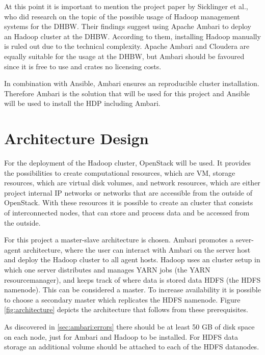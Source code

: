 At this point it is important to mention the project paper by Sicklinger et al., 
who did research on the topic of the possible usage of Hadoop management systems for the \ac{DHBW}.
Their findings suggest using Apache Ambari to deploy an Hadoop cluster at the \ac{DHBW}.
According to them, installing Hadoop manually is ruled out due to the technical complexity.
Apache Ambari and Cloudera are equally suitable for the usage at the \ac{DHBW}, 
but Ambari should be favoured since it is free to use and crates no licensing costs.
\autocite[][p. 53f]{wi2018managementsystems}

In combination with Ansible, Ambari ensures an reproducible cluster installation. 
Therefore Ambari is the solution that will be used for this project and Ansible will be used to install the \ac{HDP} including Ambari.

\section{Architecture Design}

For the deployment of the Hadoop cluster, OpenStack will be used.
It provides the possibilities to create computational resources, which are \acs{VM}, 
storage resources, which are virtual disk volumes, 
and network resources, which are either project internal \ac{IP} networks or networks that are accessible from the outside of OpenStack.
With these resources it is possible to create an cluster that consists of interconnected nodes, 
that can store and process data and be accessed from the outside.

For this project a master-slave architecture is chosen.
Ambari promotes a sever-agent architecture, 
where the user can interact with Ambari on the server host 
and deploy the Hadoop cluster to all agent hosts.
Hadoop uses an cluster setup in which one server distributes and manages \ac{YARN} jobs (the \ac{YARN} resourcemanager), 
and keeps track of where data is stored data \ac{HDFS} (the \ac{HDFS} namenode).
This can be considered a master.
To increase availability it is possible to choose a secondary master which replicates the \ac{HDFS} namenode.
Figure \vref{fig:architecture} depicts the architecture that follows from these prerequisites.

As discovered in \vref{sec:ambari:errors} there should be at least 50 \ac{GB} of disk space on each node, 
just for Ambari and Hadoop to be installed.
For \ac{HDFS} data storage an additional volume should be attached to each of the \ac{HDFS} datanodes.

